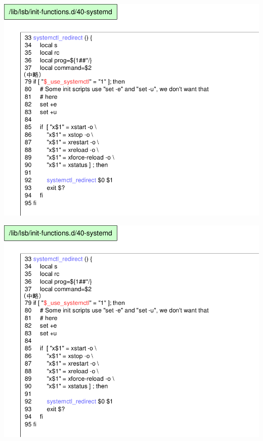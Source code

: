 \begin{frame}
\begin{center}
\includegraphics[width=1\hsize]{image201510/daemonscript3.png}
\end{center}
\end{frame}

\begin{frame}
\begin{center}
\includegraphics[width=1\hsize]{image201510/daemonscript3.png}
\end{center}
\end{frame}

